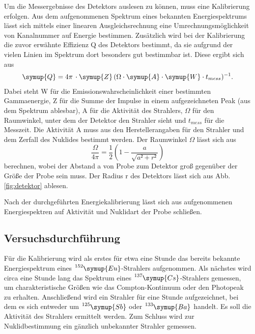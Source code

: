     \noindent
    Um die Messergebnisse des Detektors auslesen zu können, muss eine Kalibrierung erfolgen.
    Aus dem aufgenommenen Spektrum eines bekannten Energiespektrums lässt sich mittels einer linearen
    Ausgleichsrechnung eine Umrechnungsmöglichkeit von Kanalnummer auf Energie bestimmen.
    Zusätzlich wird bei der Kalibrierung die zuvor erwähnte Effizienz Q des Detektors bestimmt, da sie
    aufgrund der vielen Linien im Spektrum dort besonders gut bestimmbar ist.
    Diese ergibt sich aus
    \begin{align}
      \symup{Q} = 4\pi\,\cdot\symup{Z}\,(\Omega\cdot\symup{A}\cdot\symup{W}\cdot t_{mess})^{-1}.
      \label{eqn:effizienz}
    \end{align}
    Dabei steht W für die Emissionswahrscheinlichkeit einer bestimmten Gammaenergie, Z für
    die Summe der Impulse in einem aufgezeichneten Peak (aus dem Spektrum ablesbar), A für die
    Aktivität des Strahlers, $\Omega$ für den Raumwinkel, unter dem der Detektor den
    Strahler sieht und $t_{mess}$ für die Messzeit. Die Aktivität A muss aus den
    Herstellerangaben für den Strahler und dem Zerfall des Nuklides bestimmt werden. Der
    Raumwinkel $\Omega$ lässt sich aus
    \begin{equation}
      \frac{\Omega}{4\pi}=\frac12\left(1-\frac a{\sqrt{a²+r²}}\right)
      \label{eqn:raum}
    \end{equation}
    berechnen, wobei der Abstand a von Probe zum Detektor groß gegenüber der Größe der Probe sein muss.
    Der Radius r des Detektors lässt sich aus Abb. \ref{fig:detektor} ablesen.

    Nach der durchgeführten Energiekalibrierung lässt sich aus aufgenommenen Energiespektren
    auf Aktivität und Nuklidart der Probe schließen.

    \subsection{Versuchsdurchführung}

    Für die Kalibrierung wird als erstes für etwa eine Stunde das bereits bekannte Energiespektrum eines
    $\ce{^{152}}\symup{Eu}$-Strahlers aufgenommen.
    Als nächstes wird circa eine Stunde lang das Spektrum eines $\ce{^{137}}\symup{Cs}$-Strahlers
    gemessen, um charakteristische Größen wie das Compton-Kontinuum oder
    den Photopeak zu erhalten.
    Anschließend wird ein Strahler für eine Stunde
    aufgezeichnet, bei dem es sich entweder um $\ce{^{125}}\symup{Sb}$ oder $\ce{^{133}}\symup{Ba}$ handelt. Es soll die Aktivität des
    Strahlers ermittelt werden.
    Zum Schluss wird zur Nuklidbestimmung ein gänzlich unbekannter Strahler gemessen.



